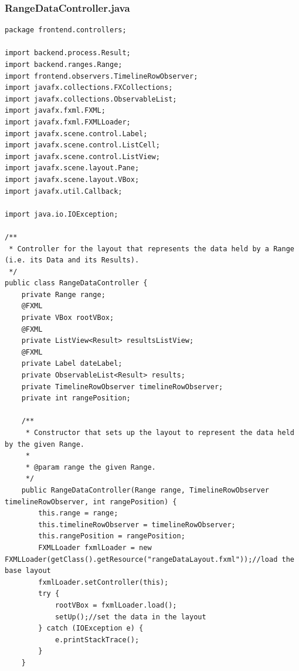 \subsubsection{RangeDataController.java}
\begin{lstlisting}
package frontend.controllers;

import backend.process.Result;
import backend.ranges.Range;
import frontend.observers.TimelineRowObserver;
import javafx.collections.FXCollections;
import javafx.collections.ObservableList;
import javafx.fxml.FXML;
import javafx.fxml.FXMLLoader;
import javafx.scene.control.Label;
import javafx.scene.control.ListCell;
import javafx.scene.control.ListView;
import javafx.scene.layout.Pane;
import javafx.scene.layout.VBox;
import javafx.util.Callback;

import java.io.IOException;

/**
 * Controller for the layout that represents the data held by a Range (i.e. its Data and its Results).
 */
public class RangeDataController {
    private Range range;
    @FXML
    private VBox rootVBox;
    @FXML
    private ListView<Result> resultsListView;
    @FXML
    private Label dateLabel;
    private ObservableList<Result> results;
    private TimelineRowObserver timelineRowObserver;
    private int rangePosition;

    /**
     * Constructor that sets up the layout to represent the data held by the given Range.
     *
     * @param range the given Range.
     */
    public RangeDataController(Range range, TimelineRowObserver timelineRowObserver, int rangePosition) {
        this.range = range;
        this.timelineRowObserver = timelineRowObserver;
        this.rangePosition = rangePosition;
        FXMLLoader fxmlLoader = new FXMLLoader(getClass().getResource("rangeDataLayout.fxml"));//load the base layout
        fxmlLoader.setController(this);
        try {
            rootVBox = fxmlLoader.load();
            setUp();//set the data in the layout
        } catch (IOException e) {
            e.printStackTrace();
        }
    }


\end{lstlisting}
